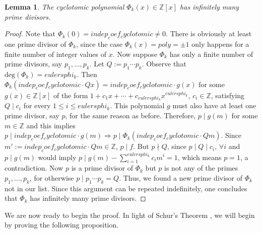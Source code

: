 \documentclass[a4paper, 12pt]{article}
\newtheorem{lemma}[theorem]{Lemma}
\theoremstyle{definition}
\theoremstyle{remark}
\newcommand{\Z}{\ensuremath{\mathbb{Z}}}
\begin{document}
\begin{lemma}\label{ThSchur}
The cyclotomic polynomial $\Phi_{{k}}(x)\in\Z[x]$ has infinitely many prime divisors.
\end{lemma}
\begin{proof}
Note that $\Phi_{{k}}(0)={indep_coef_cyclotomic}\neq 0$. There is obviously at least one prime divisor of $\Phi_{{k}}$, since the case $\Phi_{{k}}(x)={poly}=\pm 1$ only happens for a finite number of integer values of $x$. Now suppose $\Phi_{{k}}$ has only a finite number of prime divisors, say $p_1,\dots,p_k$. Let $Q:=p_1\cdots p_k$. Observe that $\text{deg}(\Phi_{{k}})={eulersphi_k}$. Then $\Phi_{{k}}({indep_coef_cyclotomic}\cdot Qx)={indep_coef_cyclotomic}\cdot g(x)$ for some $g(x)\in\Z[x]$ of the form $1+c_1x+\cdots+c_{{eulersphi_k}}x^{{eulersphi_k}}$, $c_i\in\Z$, satisfying $Q\mid c_i$ for every $1\leqslant i \leqslant {eulersphi_k}$. This polynomial $g$ must also have at least one prime divisor, say $p$, for the same reason as before. Therefore, $p\mid g(m)$ for some $m\in\Z$ and this implies $p\mid {indep_coef_cyclotomic}\cdot g(m)\Rightarrow p\mid \Phi_{{k}}({indep_coef_cyclotomic}\cdot Qm)$. Since $m':={indep_coef_cyclotomic}\cdot Qm\in\Z$, $p\mid f$. But $p\nmid Q$, since $p\mid Q\mid c_i, \,\forall i$ and $p\mid g(m)$ would imply $p\mid g(m) - \sum_{i=1}^{{eulersphi_k}}c_im^i=1$, which means $p=1$, a contradiction. Now $p$ is a prime divisor of $\Phi_{{k}}$ but $p$ is not any of the primes $p_1,\dots,p_k$, for otherwise $p\mid p_1\cdots p_k=Q$. Thus, we found a new prime divisor of $\Phi_{{k}}$ not in our list. Since this argument can be repeated indefinitely, one concludes that $\Phi_{{k}}$ has infinitely many prime divisors.
\end{proof}

We are now ready to begin the proof. In light of Schur's Theorem \cite{Murty}, we will begin by proving the following proposition.
\end{document}

